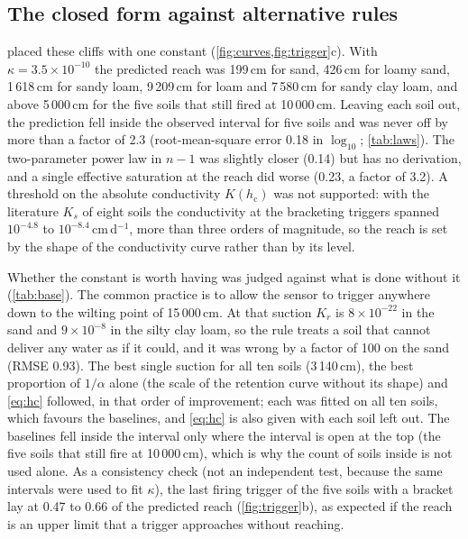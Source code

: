 \documentclass[review,12pt,authoryear]{elsarticle}
\newcommand{\hc}{h_{\mathrm{c}}}
\begin{document}

\subsection{The closed form against alternative rules}
 placed these cliffs with one constant (\cref{fig:curves,fig:trigger}c). With $\kappa=3.5\times10^{-10}$ the predicted reach was 199\,cm for sand, 426\,cm for loamy sand, 1\,618\,cm for sandy loam, 9\,209\,cm for loam and 7\,580\,cm for sandy clay loam, and above 5\,000\,cm for the five soils that still fired at 10\,000\,cm. Leaving each soil out, the prediction fell inside the observed interval for five soils and was never off by more than a factor of 2.3 (root-mean-square error 0.18 in $\log_{10}$; \cref{tab:laws}). The two-parameter power law in $n-1$ was slightly closer (0.14) but has no derivation, and a single effective saturation at the reach did worse (0.23, a factor of 3.2). A threshold on the absolute conductivity $K(\hc)$ was not supported: with the literature $K_s$ of eight soils the conductivity at the bracketing triggers spanned $10^{-4.8}$ to $10^{-8.4}$\,cm\,d$^{-1}$, more than three orders of magnitude, so the reach is set by the shape of the conductivity curve rather than by its level.


Whether the constant is worth having was judged against what is done without it (\cref{tab:base}). The common practice is to allow the sensor to trigger anywhere down to the wilting point of 15\,000\,cm. At that suction $K_r$ is $8\times10^{-22}$ in the sand and $9\times10^{-8}$ in the silty clay loam, so the rule treats a soil that cannot deliver any water as if it could, and it was wrong by a factor of 100 on the sand (RMSE 0.93). The best single suction for all ten soils (3\,140\,cm), the best proportion of $1/\alpha$ alone (the scale of the retention curve without its shape) and \cref{eq:hc} followed, in that order of improvement; each was fitted on all ten soils, which favours the baselines, and \cref{eq:hc} is also given with each soil left out. The baselines fell inside the interval only where the interval is open at the top (the five soils that still fire at 10\,000\,cm), which is why the count of soils inside is not used alone. As a consistency check (not an independent test, because the same intervals were used to fit $\kappa$), the last firing trigger of the five soils with a bracket lay at 0.47 to 0.66 of the predicted reach (\cref{fig:trigger}b), as expected if the reach is an upper limit that a trigger approaches without reaching.
\end{document}
